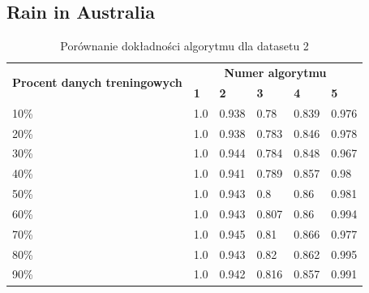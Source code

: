 \documentclass[a4paper,11pt]{article}
\begin{document}
\subsection{Rain in Australia}

\begin{table}[H]
\centering
\begin{tabular}{|l|l|l|l|l|l|}
\hline
\multicolumn{1}{|c|}{\multirow{2}{*}{\textbf{Procent danych treningowych}}} & \multicolumn{5}{c|}{\textbf{Numer algorytmu}}                       \\ \cline{2-6}
\multicolumn{1}{|c|}{}                                                      & \textbf{1} & \textbf{2} & \textbf{3} & \textbf{4} & \textbf{5} \\ \hline
10\%                                                          & 1.0         & 0.938       & 0.78        & 0.839       & 0.976       \\ \hline
20\%                                                        & 1.0         & 0.938       & 0.783       & 0.846       & 0.978       \\ \hline
30\%                                                         & 1.0         & 0.944       & 0.784       & 0.848       & 0.967       \\ \hline
40\%                                                          & 1.0         & 0.941       & 0.789       & 0.857       & 0.98        \\ \hline
50\%                                                         & 1.0         & 0.943       & 0.8         & 0.86        & 0.981       \\ \hline
60\%                                                          & 1.0         & 0.943       & 0.807       & 0.86        & 0.994       \\ \hline
70\%                                                          & 1.0         & 0.945       & 0.81        & 0.866       & 0.977       \\ \hline
80\%                                                          & 1.0         & 0.943       & 0.82        & 0.862       & 0.995       \\ \hline
90\%                                                          & 1.0         & 0.942       & 0.816       & 0.857       & 0.991       \\ \hline
\end{tabular}
\caption{Porównanie dokładności algorytmu dla datasetu 2}
\label{tab:dataset2}
\end{table}
\end{document}
